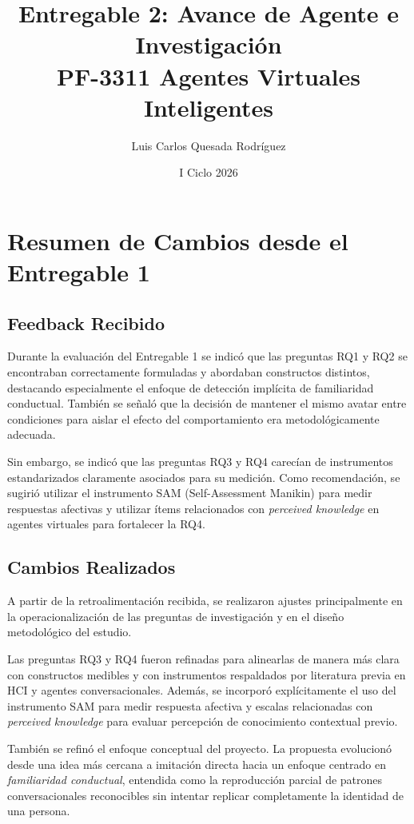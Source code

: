 \documentclass[12pt]{article}
\title{
    \textbf{Entregable 2: Avance de Agente e Investigación} \\
    \large PF-3311 Agentes Virtuales Inteligentes
}
\author{
    Luis Carlos Quesada Rodríguez
}
\date{I Ciclo 2026}
\begin{document}
\maketitle

\section{Resumen de Cambios desde el Entregable 1}

\subsection{Feedback Recibido}

Durante la evaluación del Entregable 1 se indicó que las preguntas RQ1 y RQ2 se encontraban correctamente formuladas y abordaban constructos distintos, destacando especialmente el enfoque de detección implícita de familiaridad conductual. También se señaló que la decisión de mantener el mismo avatar entre condiciones para aislar el efecto del comportamiento era metodológicamente adecuada.

Sin embargo, se indicó que las preguntas RQ3 y RQ4 carecían de instrumentos estandarizados claramente asociados para su medición. Como recomendación, se sugirió utilizar el instrumento SAM (Self-Assessment Manikin) para medir respuestas afectivas y utilizar ítems relacionados con \textit{perceived knowledge} en agentes virtuales para fortalecer la RQ4.

\subsection{Cambios Realizados}

A partir de la retroalimentación recibida, se realizaron ajustes principalmente en la operacionalización de las preguntas de investigación y en el diseño metodológico del estudio.

Las preguntas RQ3 y RQ4 fueron refinadas para alinearlas de manera más clara con constructos medibles y con instrumentos respaldados por literatura previa en HCI y agentes conversacionales. Además, se incorporó explícitamente el uso del instrumento SAM para medir respuesta afectiva y escalas relacionadas con \textit{perceived knowledge} para evaluar percepción de conocimiento contextual previo.

También se refinó el enfoque conceptual del proyecto. La propuesta evolucionó desde una idea más cercana a imitación directa hacia un enfoque centrado en \textit{familiaridad conductual}, entendida como la reproducción parcial de patrones conversacionales reconocibles sin intentar replicar completamente la identidad de una persona.
\end{document}

